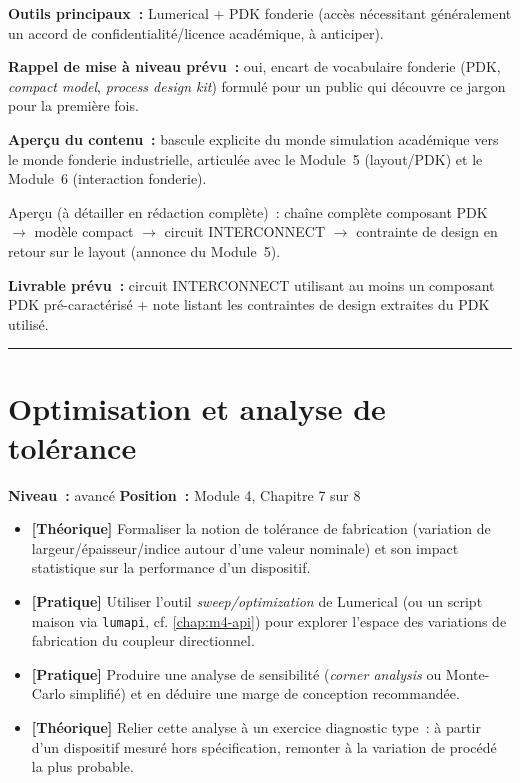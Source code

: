 \noindent\textbf{Outils principaux~:} Lumerical + PDK fonderie (accès nécessitant généralement un accord de confidentialité/licence académique, à anticiper).

\noindent\textbf{Rappel de mise à niveau prévu~:} oui, encart de vocabulaire fonderie (PDK, \emph{compact model}, \emph{process design kit}) formulé pour un public qui découvre ce jargon pour la première fois.

\noindent\textbf{Aperçu du contenu~:} bascule explicite du \og monde simulation académique\fg{} vers le \og monde fonderie industrielle\fg{}, articulée avec le Module~5 (layout/PDK) et le Module~6 (interaction fonderie).

\begin{flotfonderie}
Aperçu (à détailler en rédaction complète)~: chaîne complète composant PDK $\to$ modèle compact $\to$ circuit INTERCONNECT $\to$ contrainte de design en retour sur le layout (annonce du Module~5).
\end{flotfonderie}

\noindent\textbf{Livrable prévu~:} circuit INTERCONNECT utilisant au moins un composant PDK pré-caractérisé + note listant les contraintes de design extraites du PDK utilisé.

\bigskip\hrule\bigskip

\chapter{Optimisation et analyse de tolérance}
\label{chap:m4-tolerance}

\noindent\textbf{Niveau~:} avancé \hfill \textbf{Position~:} Module 4, Chapitre 7 sur 8

\begin{objectifs}
\begin{itemize}[leftmargin=1.4em]
  \item \textbf{[Théorique]} Formaliser la notion de tolérance de fabrication (variation de largeur/épaisseur/indice autour d'une valeur nominale) et son impact statistique sur la performance d'un dispositif.
  \item \textbf{[Pratique]} Utiliser l'outil \emph{sweep/optimization} de Lumerical (ou un script maison via \texttt{lumapi}, cf. \cref{chap:m4-api}) pour explorer l'espace des variations de fabrication du coupleur directionnel.
  \item \textbf{[Pratique]} Produire une analyse de sensibilité (\emph{corner analysis} ou Monte-Carlo simplifié) et en déduire une marge de conception recommandée.
  \item \textbf{[Théorique]} Relier cette analyse à un exercice diagnostic type~: à partir d'un dispositif mesuré hors spécification, remonter à la variation de procédé la plus probable.
\end{itemize}
\end{objectifs}

